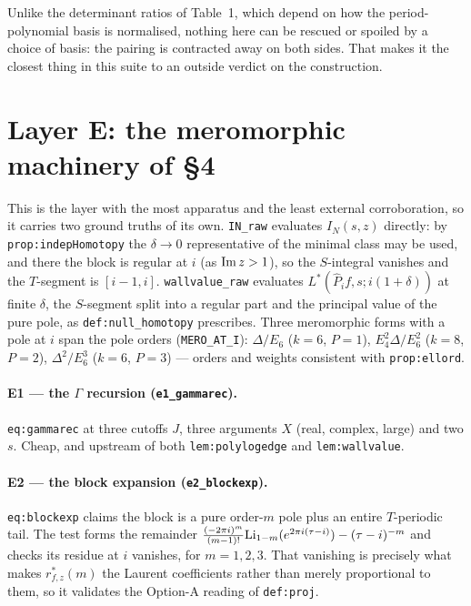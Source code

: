 \documentclass[11pt]{article}
\newcommand{\Li}{{\rm Li}}
\newcommand{\code}[1]{\texttt{#1}}
\begin{document}
Unlike the determinant ratios of Table~1, which depend on how the period-polynomial basis is
normalised, nothing here can be rescued or spoiled by a choice of basis: the pairing is
contracted away on both sides. That makes it the closest thing in this suite to an outside
verdict on the construction.


\section{Layer E: the meromorphic machinery of \S4}

This is the layer with the most apparatus and the least external corroboration, so it carries
two ground truths of its own. \code{IN\_raw} evaluates $I_N(s,z)$ directly: by
\code{prop:indepHomotopy} the $\delta\to0$ representative of the minimal class may be used, and
there the block is regular at $i$ (as ${\rm Im}\,z>1$), so the $S$-integral vanishes and the
$T$-segment is $[i-1,i]$. \code{wallvalue\_raw} evaluates $L^*(\widehat P_if,s;i(1+\delta))$ at
finite $\delta$, the $S$-segment split into a regular part and the principal value of the pure
pole, as \code{def:null\_homotopy} prescribes. Three meromorphic forms with a pole at $i$ span
the pole orders (\code{MERO\_AT\_I}): $\Delta/E_6$ ($k=6$, $P=1$), $E_4^2\Delta/E_6^2$ ($k=8$,
$P=2$), $\Delta^2/E_6^3$ ($k=6$, $P=3$) --- orders and weights consistent with
\code{prop:ellord}.

\paragraph{E1 --- the $\Gamma$ recursion (\code{e1\_gammarec}).}
\code{eq:gammarec} at three cutoffs $J$, three arguments $X$ (real, complex, large) and two
$s$. Cheap, and upstream of both \code{lem:polylogedge} and \code{lem:wallvalue}.

\paragraph{E2 --- the block expansion (\code{e2\_blockexp}).}
\code{eq:blockexp} claims the block is a pure order-$m$ pole plus an entire $T$-periodic tail.
The test forms the remainder $\tfrac{(-2\pi i)^m}{(m-1)!}\Li_{1-m}(e^{2\pi i(\tau-i)})-(\tau-i)^{-m}$
and checks its residue at $i$ vanishes, for $m=1,2,3$. That vanishing is precisely what makes
$r^*_{f,z}(m)$ the Laurent coefficients rather than merely proportional to them, so it validates
the Option-A reading of \code{def:proj}.
\end{document}
